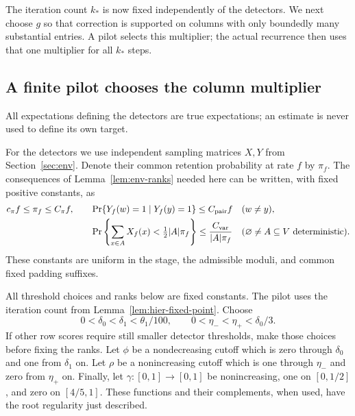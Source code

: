 The iteration count $k_*$ is now fixed independently of the detectors.
We next choose $g$ so that correction is supported on columns with only
boundedly many substantial entries.  A pilot selects this multiplier;
the actual recurrence then uses that one multiplier for all $k_*$ steps.

\subsection{A finite pilot chooses the column multiplier}

All expectations defining the detectors are true expectations; an
estimate is never used to define its own target.

For the detectors we use independent sampling matrices $X,Y$ from
Section~\ref{sec:env}.  Denote their common retention probability at rate
$f$ by $\pi_f$.  The consequences of Lemma~\ref{lem:env-ranks} needed here
can be written, with fixed positive constants, as
\begin{align}
 c_\pi f\leq\pi_f\leq C_\pi f,\qquad
 &\Pr\{Y_f(w)=1\mid Y_f(y)=1\}\leq C_{\rm pair} f
       &&(w\ne y), \label{eq:hier-sampling-pair}\\
 &\Pr\left\{\sum_{x\in A}X_f(x)<\tfrac12|A|\pi_f\right\}
       \leq\frac{C_{\rm var}}{|A|\pi_f}
       &&(\varnothing\ne A\subseteq V\text{ deterministic}).
       \label{eq:hier-sampling-tail}
\end{align}
These constants are uniform in the stage, the admissible moduli, and common
fixed padding suffixes.

All threshold choices and ranks below are fixed constants.  The pilot
uses the iteration count from Lemma~\ref{lem:hier-fixed-point}.  Choose
\[
 0<\delta_0<\delta_1<\theta_1/100,
 \qquad 0<\eta_-<\eta_+<\delta_0/3.
\]
If other row scores require still smaller detector thresholds, make those
choices before fixing the ranks.  Let $\phi$ be a nondecreasing cutoff
which is zero through $\delta_0$ and one from $\delta_1$ on.  Let $\rho$
be a nonincreasing cutoff which is one through $\eta_-$ and zero from
$\eta_+$ on.  Finally, let $\gamma:[0,1]\to[0,1]$ be nonincreasing,
one on $[0,1/2]$, and zero on $[4/5,1]$.  These functions and their
complements, when used, have the root regularity just described.

